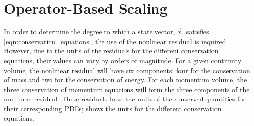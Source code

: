 \section{Operator-Based Scaling}
\label{sect:operator_scaling}
In order to determine the degree to which a state vector, $\vec{x}$, satisfies \eqref{eqn:conservation_equations}, the use of the nonlinear residual is required.
However, due to the units of the residuals for the different conservation equations, their values can vary by orders of magnitude. 
For a given continuity volume, the nonlinear residual will have six components: four for the conservation of mass and two for the conservation of energy.
For each momentum volume, the three conservation of momentum equations will form the three components of the nonlinear residual.
These residuals have the units of the conserved quantities for their corresponding PDEs;  shows the units for the different conservation equations.

